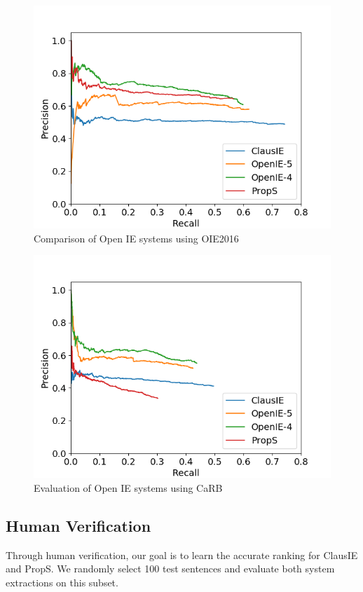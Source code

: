         \begin{figure}[h!]
            \centering
        \vspace*{-2ex}
            \includegraphics[width=0.7\columnwidth]{images/carb/oie16.png}
            \caption{Comparison of Open IE systems using OIE2016}
            \label{fig:pr_oie16}
        \end{figure}
        
        \begin{figure}[h!]
            \centering
        \vspace*{-3ex}
            \includegraphics[width=0.7\columnwidth]{images/carb/carb.png}
            \caption{Evaluation of Open IE systems using CaRB}
            \label{fig:pr_carb}
        \end{figure}

    
    \subsection{Human Verification}
        Through human verification, our goal is to learn the accurate ranking for ClausIE and PropS.  We randomly select 100 test sentences and evaluate both system extractions on this subset. 

